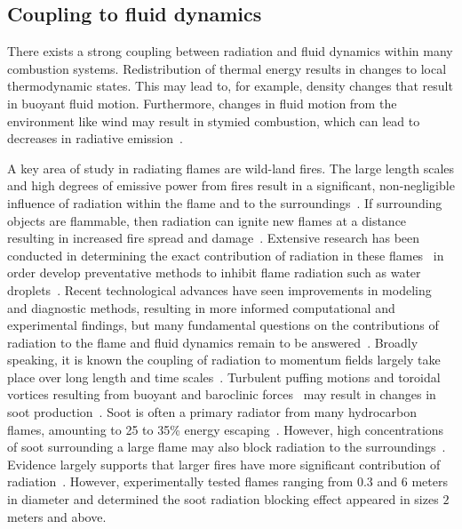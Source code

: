 
\subsection{Coupling to fluid dynamics}
There exists a strong coupling between radiation and fluid dynamics within many combustion systems. Redistribution of thermal energy results in changes to local thermodynamic states. This may lead to, for example, density changes that result in buoyant fluid motion. Furthermore, changes in fluid motion from the environment like wind may result in stymied combustion, which can lead to decreases in radiative emission~\cite{Hu2017AChallenges}.

A key area of study in radiating flames are wild-land fires. The large length scales and high degrees of emissive power from fires result in a significant, non-negligible influence of radiation within the flame and to the surroundings~\cite{Drysdale2011AnDynamics}. If surrounding objects are flammable, then radiation can ignite new flames at a distance resulting in increased fire spread and damage~\cite{Valendik2008EffectEnvironment}. Extensive research has been conducted in determining the exact contribution of radiation in these flames~\cite{Sacadura2005RadiativeScience} in order develop preventative methods to inhibit flame radiation such as water droplets~\cite{Wu2018RadiationStudy}. 
Recent technological advances have seen improvements in modeling and diagnostic methods, resulting in more informed computational and experimental findings, but many fundamental questions on the contributions of radiation to the flame and fluid dynamics remain to be answered~\cite{Finney2013OnSpread}. 
Broadly speaking, it is known the coupling of radiation to momentum fields largely take place over long length and time scales~\cite{Tieszen2001ONFIRES}. Turbulent puffing motions and toroidal vortices resulting from buoyant and baroclinic forces~\cite{Cetegen1993ExperimentsFires} may result in changes in soot production~\cite{Chen2023PoolAdvances}. Soot is often a primary radiator from many hydrocarbon flames, amounting to 25 to 35\% energy escaping~\cite{Tieszen2001ONFIRES}. However, high concentrations of soot surrounding a large flame may also block radiation to the surroundings~\cite{Hamins1995CharacteristicsBurning}. Evidence largely supports that larger fires have more significant contribution of radiation~\cite{Chen2023PoolAdvances}. However, \citet{Hiroshi1988AirFires} experimentally tested flames ranging from $0.3$ and $6$ meters in diameter and determined the soot radiation blocking effect appeared in sizes $2$ meters and above.


